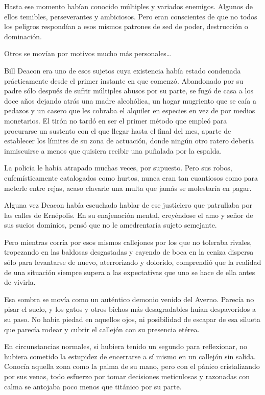Hasta ese momento habían conocido múltiples y variados enemigos. Algunos de ellos temibles, perseverantes y ambiciosos. Pero eran conscientes de que no todos los peligros respondían a esos mismos patrones de sed de poder, destrucción o dominación.

Otros se movían por motivos mucho más personales\dots

\fancyparbreak
Bill Deacon era uno de esos sujetos cuya existencia había estado condenada prácticamente desde el primer instante en que comenzó. Abandonado por su padre sólo después de sufrir múltiples abusos por su parte, se fugó de casa a los doce años dejando atrás una madre alcohólica, un hogar mugriento que se caía a pedazos y un casero que les cobraba el alquiler en especies en vez de por medios monetarios. El tirón no tardó en ser el primer método que empleó para procurarse un sustento con el que llegar hasta el final del mes, aparte de establecer los límites de su zona de actuación, donde ningún otro ratero debería inmiscuirse a menos que quisiera recibir una puñalada por la espalda.

La policía le había atrapado muchas veces, por supuesto. Pero sus robos, eufemísticamente catalogados como hurtos, nunca eran tan cuantiosos como para meterle entre rejas, acaso clavarle una multa que jamás se molestaría en pagar.

Alguna vez Deacon había escuchado hablar de ese justiciero que patrullaba por las calles de Ernépolis. En su enajenación mental, creyéndose el amo y señor de sus sucios dominios, pensó que no le amedrentaría sujeto semejante.

Pero mientras corría por esos mismos callejones por los que no toleraba rivales, tropezando en las baldosas desgastadas y cayendo de boca en la ceniza dispersa sólo para levantarse de nuevo, aterrorizado y dolorido, comprendió que la realidad de una situación siempre supera a las expectativas que uno se hace de ella antes de vivirla.

Esa sombra se movía como un auténtico demonio venido del Averno. Parecía no pisar el suelo, y los gatos y otros bichos más desagradables huían despavoridos a su paso. No había piedad en aquellos ojos, ni posibilidad de escapar de esa silueta que parecía rodear y cubrir el callejón con su presencia etérea.

En circunstancias normales, si hubiera tenido un segundo para reflexionar, no hubiera cometido la estupidez de encerrarse a sí mismo en un callejón sin salida. Conocía aquella zona como la palma de su mano, pero con el pánico cristalizando por sus venas, todo esfuerzo por tomar decisiones meticulosas y razonadas con calma se antojaba poco menos que titánico por su parte.

